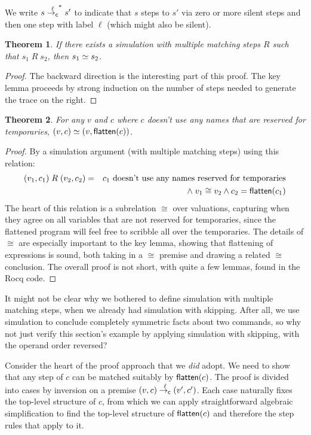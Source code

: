 \documentclass{amsbook}
\newtheorem{theorem}{Theorem}[chapter]
\theoremstyle{definition}
\theoremstyle{remark}
\numberwithin{section}{chapter}
\numberwithin{equation}{chapter}
\begin{document}
We write $s \stackrel{\ell}{\to_\mathsf{c}}^* s'$ to indicate that $s$ steps to $s'$ via zero or more silent steps and then one step with label $\ell$ (which might also be silent).

\begin{theorem}
  If there exists a simulation with multiple matching steps $R$ such that $s_1 \; R \; s_2$, then $s_1 \simeq s_2$.
\end{theorem}
\begin{proof}
  The backward direction is the interesting part of this proof.
  The key lemma proceeds by strong induction on the number of steps needed to generate the trace on the right.
\end{proof}

\begin{theorem}
  For any $v$ and $c$ where $c$ doesn't use any names that are reserved for temporaries, $(v, c) \simeq (v, \mathsf{flatten}(c))$.
\end{theorem}
\begin{proof}
  By a simulation argument (with multiple matching steps) using this relation:
  \begin{eqnarray*}
    (v_1, c_1) \; R \; (v_2, c_2) &=& \textrm{$c_1$ doesn't use any names reserved for temporaries} \\
    && \land \; v_1 \cong v_2 \land c_2 = \mathsf{flatten}(c_1)
  \end{eqnarray*}
  The heart of this relation is a subrelation $\cong$ over valuations, capturing when they agree on all variables that are not reserved for temporaries, since the flattened program will feel free to scribble all over the temporaries.
  The details of $\cong$ are especially important to the key lemma, showing that flattening of expressions is sound, both taking in a $\cong$ premise and drawing a related $\cong$ conclusion.
  The overall proof is not short, with quite a few lemmas, found in the Rocq code.
\end{proof}

\medskip

It might not be clear why we bothered to define simulation with multiple matching steps, when we already had simulation with skipping.
After all, we use simulation to conclude completely symmetric facts about two commands, so why not just verify this section's example by applying simulation with skipping, with the operand order reversed?

Consider the heart of the proof approach that we \emph{did} adopt.
We need to show that any step of $c$ can be matched suitably by $\mathsf{flatten}(c)$.
The proof is divided into cases by inversion on a premise $(v, c) \stackrel{\ell}{\to_\mathsf{c}} (v', c')$.
Each case naturally fixes the top-level structure of $c$, from which we can apply straightforward algebraic simplification to find the top-level structure of $\mathsf{flatten}(c)$ and therefore the step rules that apply to it.
\end{document}
